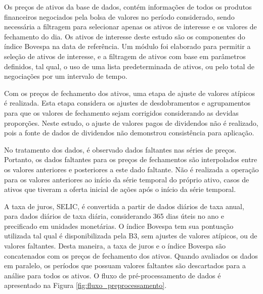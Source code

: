         \ipar Os preços de ativos da base de dados, contém informações de todos os produtos financeiros negociados pela bolsa de valores no período considerado, sendo necessária a filtragem para selecionar apenas os ativos de interesse e os valores de fechamento do dia. Os ativos de interesse deste estudo são os componentes do índice Bovespa na data de referência. Um módulo foi elaborado para permitir a seleção de ativos de interesse, e a filtragem de ativos com base em parâmetros definidos, tal qual, o uso de uma lista predeterminada de ativos, ou pelo total de negociações por um intervalo de tempo.

        \ipar Com os preços de fechamento dos ativos, uma etapa de ajuste de valores atípicos é realizada. Esta etapa considera os ajustes de desdobramentos e agrupamentos para que os valores de fechamento sejam corrigidos considerando as devidas proporções. Neste estudo, o ajuste de valores pagos de dividendos não é realizado, pois a fonte de dados de dividendos não demonstrou consistência para aplicação. 

        \ipar No tratamento dos dados, é observado dados faltantes nas séries de preços. Portanto, os dados faltantes para os preços de fechamentos são interpolados entre os valores anteriores e posteriores a este dado faltante. Não é realizada a operação para os valores anteriores ao início da série temporal do próprio ativo, casos de ativos que tiveram a oferta inicial de ações após o início da série temporal.

        \ipar A taxa de juros, SELIC, é convertida a partir de dados diários de taxa anual, para dados diários de taxa diária, considerando 365 dias úteis no ano e precificado em unidades monetárias. O índice Bovespa tem sua pontuação utilizada tal qual é disponibilizada pela B3, sem ajustes de valores atípicos, ou de valores faltantes. Desta maneira, a taxa de juros e o índice Bovespa são concatenados com os preços de fechamento dos ativos. Quando avaliados os dados em paralelo, os períodos que possuam valores faltantes são descartados para a análise para todos os ativos. O fluxo de pré-processamento de dados é apresentado na Figura \ref{fig:fluxo_preprocessamento}.

